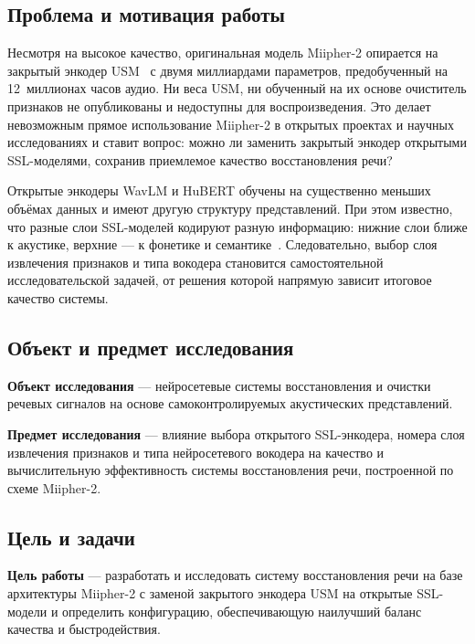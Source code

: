 \subsection{Проблема и мотивация работы}

Несмотря на высокое качество, оригинальная модель Miipher-2 опирается на
закрытый энкодер USM~\cite{usm} с двумя миллиардами параметров, предобученный
на 12~миллионах часов аудио. Ни веса USM, ни обученный на их основе очиститель
признаков не опубликованы и недоступны для воспроизведения. Это делает
невозможным прямое использование Miipher-2 в открытых проектах и научных
исследованиях и ставит вопрос: можно ли заменить закрытый энкодер открытыми
SSL-моделями, сохранив приемлемое качество восстановления речи?

Открытые энкодеры WavLM и HuBERT обучены на существенно меньших объёмах данных
и имеют другую структуру представлений. При этом известно, что разные слои
SSL-моделей кодируют разную информацию: нижние слои ближе к акустике, верхние
--- к фонетике и семантике~\cite{superb}. Следовательно, выбор слоя извлечения
признаков и типа вокодера становится самостоятельной исследовательской задачей,
от решения которой напрямую зависит итоговое качество системы.

\subsection{Объект и предмет исследования}

\textbf{Объект исследования} --- нейросетевые системы восстановления и очистки
речевых сигналов на основе самоконтролируемых акустических представлений.

\textbf{Предмет исследования} --- влияние выбора открытого SSL-энкодера, номера
слоя извлечения признаков и типа нейросетевого вокодера на качество и
вычислительную эффективность системы восстановления речи, построенной по схеме
Miipher-2.

\subsection{Цель и задачи}

\textbf{Цель работы} --- разработать и исследовать систему восстановления речи
на базе архитектуры Miipher-2 с заменой закрытого энкодера USM на открытые
SSL-модели и определить конфигурацию, обеспечивающую наилучший баланс качества
и быстродействия.

